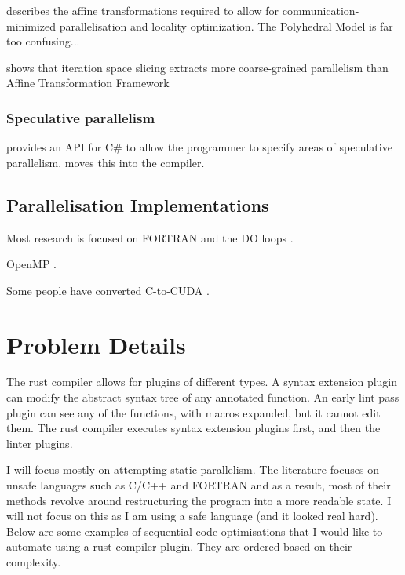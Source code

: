 \documentclass[conference]{IEEEtran}
\begin{document}
\textcite{Bondhugula2008} describes the affine transformations required to allow for communication-minimized parallelisation and locality optimization. The Polyhedral Model is far too confusing...

\textcite{Beletska2011} shows that iteration space slicing extracts more coarse-grained parallelism than Affine Transformation Framework

\subsubsection{Speculative parallelism}
\textcite{Prabhu2010} provides an API for C\# to allow the programmer to specify areas of speculative parallelism. \textcite{Yiapanis2015} moves this into the compiler.

\subsection{Parallelisation Implementations}
Most research is focused on FORTRAN and the DO loops \parencite{Banerjee1993}.

OpenMP \parencite{Dagum1998,Lam2011}.

Some people have converted C-to-CUDA \parencite{Baskaran2010, Verdoolaege2013}.

\section{Problem Details}

The rust compiler allows for plugins of different types. A syntax extension plugin can modify the abstract syntax tree of any annotated function. An early lint pass plugin can see any of the functions, with macros expanded, but it cannot edit them. The rust compiler executes syntax extension plugins first, and then the linter plugins.

I will focus mostly on attempting static parallelism. The literature focuses on unsafe languages such as C/C++ and FORTRAN and as a result, most of their methods revolve around restructuring the program into a more readable state. I will not focus on this as I am using a safe language (and it looked real hard).
Below are some examples of sequential code optimisations that I would like to automate using a rust compiler plugin. They are ordered based on their complexity.
\end{document}
